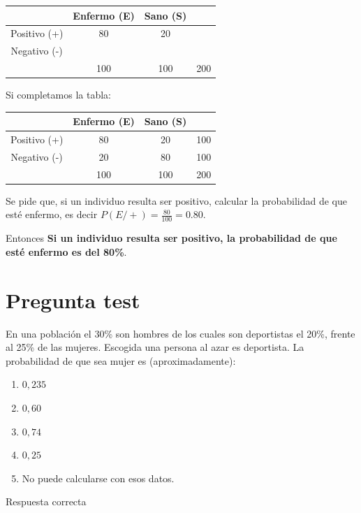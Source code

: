 \documentclass[
]{book}
\providecommand{\tightlist}{%
  \setlength{\itemsep}{0pt}\setlength{\parskip}{0pt}}
\begin{document}
\begin{longtable}[]{@{}cccc@{}}
\toprule
& Enfermo (E) & Sano (S) &\tabularnewline
\midrule
\endhead
Positivo (+) & 80 & 20 &\tabularnewline
Negativo (-) & & &\tabularnewline
& 100 & 100 & 200\tabularnewline
\bottomrule
\end{longtable}

Si completamos la tabla:

\begin{longtable}[]{@{}cccc@{}}
\toprule
& Enfermo (E) & Sano (S) &\tabularnewline
\midrule
\endhead
Positivo (+) & 80 & 20 & 100\tabularnewline
Negativo (-) & 20 & 80 & 100\tabularnewline
& 100 & 100 & 200\tabularnewline
\bottomrule
\end{longtable}

Se pide que, si un individuo resulta ser positivo, calcular la probabilidad de que esté enfermo, es decir \(P(E/+)= \frac{80}{100}=0.80\).

Entonces \textbf{Si un individuo resulta ser positivo, la probabilidad de que esté enfermo es del 80\%}.

\hypertarget{pregunta-test-133}{%
\section{Pregunta test}\label{pregunta-test-133}}

En una población el 30\% son hombres de los cuales son deportistas el 20\%, frente al 25\% de las mujeres. Escogida una persona al azar es deportista. La probabilidad de que sea mujer es (aproximadamente):

\begin{enumerate}
\def\labelenumi{\alph{enumi})}
\tightlist
\item
  \(0,235\)
\item
  \(0,60\)
\item
  \(0,74\)
\item
  \(0,25\)
\item
  No puede calcularse con esos datos.
\end{enumerate}

Respuesta correcta

  
\end{document}
